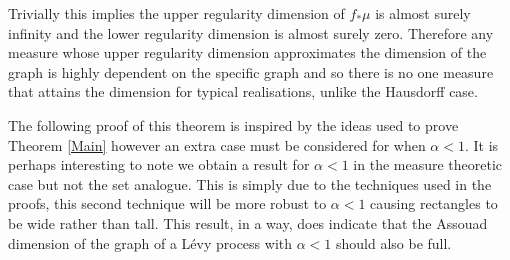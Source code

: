Trivially this implies the upper regularity dimension of $f_*\mu$ is almost surely infinity and the lower regularity dimension is almost surely zero. Therefore any measure whose upper regularity dimension approximates the dimension of the graph is highly dependent on the specific graph and so there is no one measure that attains the dimension for typical realisations, unlike the Hausdorff case. 

The following proof of this theorem is inspired by the ideas used to prove Theorem \ref{Main} however an extra case must be considered for when $\alpha < 1$. It is perhaps interesting to note we obtain a result for $\alpha < 1$ in the measure theoretic case but not the set analogue. This is simply due to the techniques used in the proofs, this second technique will be more robust to $\alpha < 1$ causing rectangles to be wide rather than tall. This result, in a way, does indicate that the Assouad dimension of the graph of a L\'evy process with $\alpha < 1$ should also be full.


